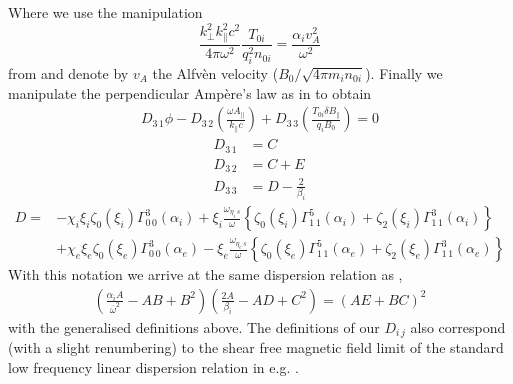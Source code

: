 \documentclass[prb,aps,amssymb,amsmath,a4paper]{revtex4}
\begin{document}
Where we use the manipulation
\[
\frac{k^2_\perp k^2_\parallel c^2}{4\pi \omega^2} \frac{T_{0i}}{q^2_i n_{0i}} = \frac{ \alpha_i v_A^2}{\omega^2}
\]
from \cite{howes2006agb} and denote by $v_A$ the Alfv\`en velocity ($B_0 / \sqrt{4\pi m_i n_{0i}}$).
Finally we manipulate the perpendicular Amp\`ere's law as in \cite{howes2006agb} to obtain 
\begin{align}
D_{3\,1}\phi - D_{3\,2} \left(\frac{\omega A_\parallel}{k_\parallel c}\right) + D_{3\,3} \left(\frac{T_{0i} \delta B_\parallel}{q_i B_0}\right)  = 0
\end{align}
\begin{align}
\nonumber
D_{3\,1} &= C \\ \nonumber
D_{3\,2} &= C + E \\ \nonumber
D_{3\,3} &= D - \frac{2}{\beta_i}
\end{align}
\begin{align}
D =&- \chi_i \xi_i \zeta_0(\xi_i)\Gamma^{3}_{0\,0}(\alpha_i) + \xi_i \frac{\omega_{\eta_i\,s}}{\omega} \left\{ \zeta_0(\xi_i) \Gamma^5_{1\,1}(\alpha_i) + \zeta_2(\xi_i) \Gamma^{3}_{1\,1}(\alpha_i) \right\} \\ \nonumber
&+ \chi_e \xi_e \zeta_0(\xi_e)\Gamma^{3}_{0\,0}(\alpha_e) - \xi_e \frac{\omega_{\eta_e\,s}}{\omega} \left\{ \zeta_0(\xi_e) \Gamma^5_{1\,1}(\alpha_e) + \zeta_2(\xi_e) \Gamma^{3}_{1\,1}(\alpha_e) \right\}
\end{align}
With this notation we arrive at the same dispersion relation as \cite{howes2006agb} , 
	  \begin{align}
	  \label{gkdisp}
	  \left( \frac{\alpha_i A}{\overline{\omega}^2} - AB + B^2\right)\left(\frac{2A}{\beta_i} - AD + C^2\right) = \left( AE + BC \right)^2
	  \end{align}
with the generalised definitions above. The definitions of our $D_{i\,j}$ also correspond (with a slight renumbering) to the shear free magnetic field limit of the standard low frequency linear dispersion relation in e.g. \cite{pu1985fbs}.


\end{document}
